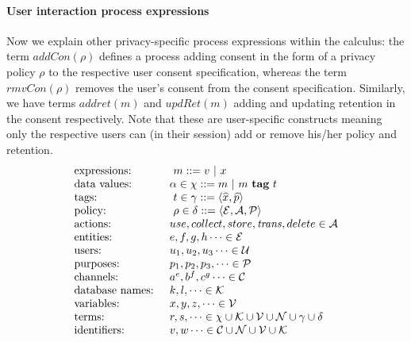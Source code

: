   \paragraph{User interaction process expressions} Now we explain other privacy-specific process expressions within the calculus: the term $ addCon(\rho)$ defines a process adding consent in the form of a privacy policy $ \rho$  to the respective user consent specification, whereas the term $ rmvCon(\rho) $ removes the user's consent from the consent specification. Similarly, we have terms $ addret(m)$ and $updRet(m) $ adding and updating 
retention in the consent respectively. Note that these are user-specific constructs meaning only the respective users can (in their session)  add or remove his/her policy and retention.
\vspace{-1mm}
\begin{equation*}
\begin{array}{lll}
 \textrm{expressions:} &  \ m  ::    =  v \ | \ x \   \    \\
  \textrm{data values: }  \ &  \alpha \in \chi ::    =  m \ | \ m \  \textbf{tag} \ t  \    \\
 \textrm{tags:}  &  \ t \in \gamma ::    = \langle \widehat{x} , \widehat{p} \rangle        \\ 
  \textrm{policy:} &  \ \rho  \in \delta ::    = \langle \mathcal{E} ,\mathcal{A} , \mathcal{P} \rangle   \\ 
  \textrm{actions:  } & use, collect, store, \mathit{trans}, delete \in \mathcal{A}\\ 
\textrm{entities: }&  e, f, g,h \dots \in  \mathcal{E} \\
\textrm{users:} &  u_1, u_2, u_3 \dots  \in  \mathcal{U} \\
\textrm{purposes: }&p_1, p_2, p_3, \dots\in  \mathcal{P} \\
\textrm{channels: }&a^{e}, b^{f}, c^{g} \dots \in  \mathcal{C} \\
\textrm{database names: }& k, l, \dots \in  \mathcal{K}\\
\textrm{variables:} & x, y, z,  \dots \in  \mathcal{V}\\ 
\textrm{terms: }& r, s,\dots \in  \chi  \cup \mathcal{K} \cup \mathcal{V} \cup \mathcal{N} \cup \gamma \cup \delta \\ 
\textrm{identifiers: }&  v, w \dots \in  \mathcal{C} \cup \mathcal{N}  \cup \mathcal{V} \cup \mathcal{K}   \\ \\
\end{array}
\end{equation*}
